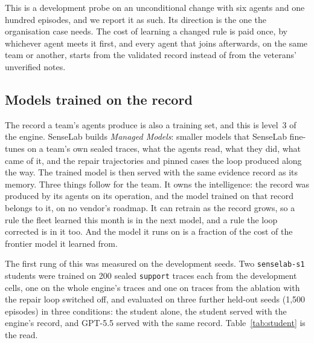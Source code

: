 \documentclass[11pt]{article}
\newcommand{\code}[1]{\texttt{#1}}
\begin{document}
This is a development probe on an unconditional change with six agents and one hundred
episodes, and we report it as such. Its direction is the one the organisation case needs. The
cost of learning a changed rule is paid once, by whichever agent meets it first, and every agent
that joins afterwards, on the same team or another, starts from the validated record instead of
from the veterans' unverified notes.

\subsection{Models trained on the record}
\label{sec:models}

The record a team's agents produce is also a training set, and this is level~3 of the engine.
SenseLab builds \emph{Managed Models}: smaller models that SenseLab fine-tunes on a team's own
sealed traces, what the agents read, what they did, what came of it, and the repair
trajectories and pinned cases the loop produced along the way. The trained model is then served
with the same evidence record as its memory. Three things follow for the team. It owns the
intelligence: the record was produced by its agents on its operation, and the model trained on
that record belongs to it, on no vendor's roadmap. It can retrain as the record grows, so a
rule the fleet learned this month is in the next model, and a rule the loop corrected is in it
too. And the model it runs on is a fraction of the cost of the frontier model it learned from.

The first rung of this was measured on the development seeds. Two \code{senselab-s1} students
were trained on 200 sealed \code{support} traces each from the development cells, one on the
whole engine's traces and one on traces from the ablation with the repair loop switched off,
and evaluated on three further held-out seeds (1,500 episodes) in three conditions: the student
alone, the student served with the engine's record, and GPT-5.5 served with the same record.
Table~\ref{tab:student} is the read.
\end{document}
